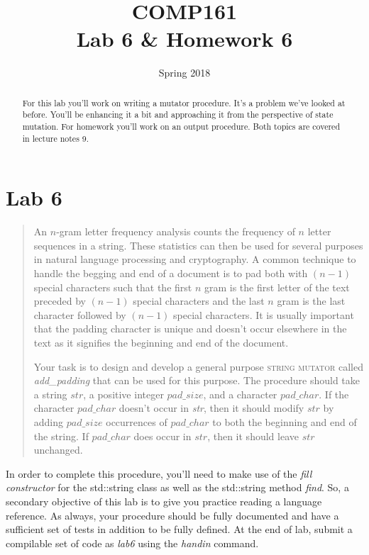 \documentclass[nobib]{tufte-handout}
\title{COMP161 \\ Lab 6 \& Homework 6}
\author{}
\date{Spring 2018}
\begin{document}
\maketitle

\begin{abstract}
For this lab you'll work on writing a mutator procedure. It's a problem we've looked at before. You'll be enhancing it a bit and approaching it from the perspective of state mutation. For homework you'll work on an output procedure. Both topics are covered in lecture notes 9.
\end{abstract}

\section{Lab 6}

\begin{framed}
\begin{quote}
An $n$-gram letter frequency analysis counts the frequency of $n$ letter sequences in a string. These statistics can then be used for several purposes in natural language processing and cryptography. A common technique to handle the begging and end of a document is to pad both with $(n-1)$ special characters such that the first $n$ gram is the first letter of the text preceded by $(n-1)$ special characters and the last $n$ gram is the last character followed by $(n-1)$ special characters. It is usually important that the padding character is unique and doesn't occur elsewhere in the text as it signifies the beginning and end of the document.

Your task is to design and develop a general purpose \textsc{string mutator} called \textit{add\_padding} that can be used for this purpose. The procedure should take a string $str$, a positive integer $pad\_size$, and a character $pad\_char$. If the character $pad\_char$ doesn't occur in \textit{str}, then it should modify $str$ by adding  $pad\_size$ occurrences of $pad\_char$ to both the beginning and end of the string. If $pad\_char$ does occur in $str$, then it should leave $str$ unchanged.
\end{quote}
\end{framed}

In order to complete this procedure, you'll need to make use of the \textit{fill constructor} for the std::string class as well as the std::string method \textit{find}.  So, a secondary objective of this lab is to give you practice reading a language reference.  As always, your procedure should be fully documented and have a sufficient set of tests in addition to be fully defined. At the end of lab, submit a compilable set of code as \textit{lab6} using the \textit{handin} command.
\end{document}
